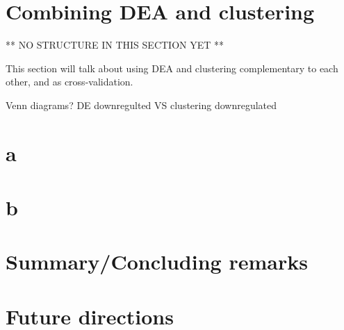 
\section{Combining DEA and clustering}


** NO STRUCTURE IN THIS SECTION YET  **

This section will talk about using DEA and clustering complementary to each other, and as cross-validation. 

Venn diagrams? DE downregulted VS clustering downregulated

\section{a}
\section{b}
\section{Summary/Concluding remarks}
\section{Future directions}